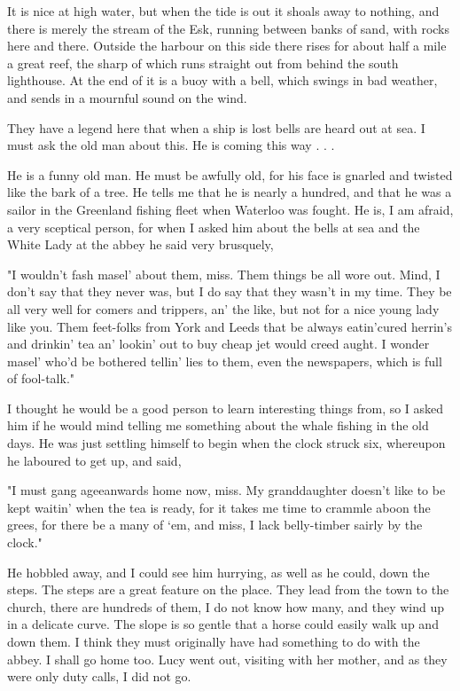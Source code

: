 It is nice at high water, but when the tide is out it shoals away to nothing, and there is merely the stream of the Esk, running between banks of sand, with rocks here and there. Outside the harbour on this side there rises for about half a mile a great reef, the sharp of which runs straight out from behind the south lighthouse. At the end of it is a buoy with a bell, which swings in bad weather, and sends in a mournful sound on the wind. 

They have a legend here that when a ship is lost bells are heard out at sea. I must ask the old man about this. He is coming this way . . . 

He is a funny old man. He must be awfully old, for his face is gnarled and twisted like the bark of a tree. He tells me that he is nearly a hundred, and that he was a sailor in the Greenland fishing fleet when Waterloo was fought. He is, I am afraid, a very sceptical person, for when I asked him about the bells at sea and the White Lady at the abbey he said very brusquely, 

"I wouldn't fash masel' about them, miss. Them things be all wore out. Mind, I don't say that they never was, but I do say that they wasn't in my time. They be all very well for comers and trippers, an' the like, but not for a nice young lady like you. Them feet-folks from York and Leeds that be always eatin'cured herrin's and drinkin' tea an' lookin' out to buy cheap jet would creed aught. I wonder masel' who'd be bothered tellin' lies to them, even the newspapers, which is full of fool-talk." 

I thought he would be a good person to learn interesting things from, so I asked him if he would mind telling me something about the whale fishing in the old days. He was just settling himself to begin when the clock struck six, whereupon he laboured to get up, and said, 

"I must gang ageeanwards home now, miss. My granddaughter doesn't like to be kept waitin' when the tea is ready, for it takes me time to crammle aboon the grees, for there be a many of `em, and miss, I lack belly-timber sairly by the clock." 

He hobbled away, and I could see him hurrying, as well as he could, down the steps. The steps are a great feature on the place. They lead from the town to the church, there are hundreds of them, I do not know how many, and they wind up in a delicate curve. The slope is so gentle that a horse could easily walk up and down them. I think they must originally have had something to do with the abbey. I shall go home too. Lucy went out, visiting with her mother, and as they were only duty calls, I did not go. 

